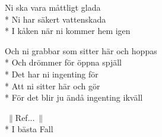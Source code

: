\begin{SongText}[Pessemistkonsulten]
\begin{SongVerse}
        Ni ska vara måttligt glada\\*%
        Ni har säkert vattenskada\\*%
        I kåken när ni kommer hem igen
    \end{SongVerse}
    \begin{SongVerse}
        Och ni grabbar som sitter här och hoppas\\*%
        Och drömmer för öppna spjäll\\*%
        Det har ni ingenting för\\*%
        Att ni sitter här och gör\\*%
        För det blir ju ändå ingenting ikväll
    \end{SongVerse}
    \begin{SongVerse}
        $\:\|$Ref...$\:\|$\\*%
        I bästa Fall
    \end{SongVerse}
\end{SongText}
